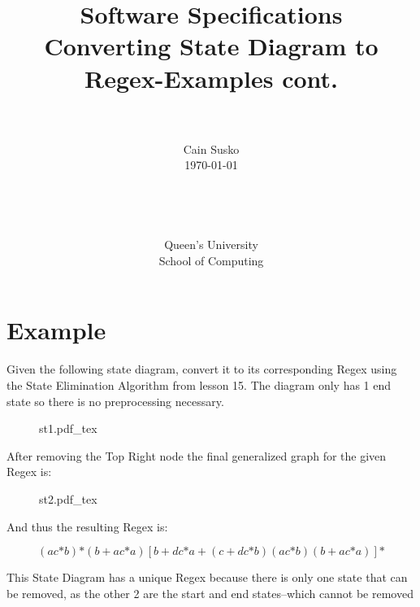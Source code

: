 \documentclass[12pt]{book}
\newcommand{\classID}{Converting State Diagram to Regex-Examples cont.}
\newcommand{\coursename}{Software Specifications}
\newcommand{\incfig}[1]{%
    {#1.pdf_tex}
}
\begin{document}
\date{}
\setlength{\parindent}{0em}  %

\title{\coursename\\\classID}

\author{\\ \\ Cain Susko\\\today \\ \\ \\ \\ \\
        Queen's University \\School of Computing} 
 

\maketitle
\pagebreak

\section*{Example}

Given the following state diagram, convert it to its corresponding Regex using the State Elimination Algorithm from lesson 15.
The diagram only has 1 end state so there is no preprocessing necessary.
\begin{figure}[h]
        \centering
        \incfig{st1}
\end{figure}

After removing the Top Right node the final generalized graph for the given Regex is:
\begin{figure}[h]
        \centering
        \incfig{st2}
\end{figure}

And thus the resulting Regex is:

\[(ac\text{*}b)\text{*}(b+ac\text{*}a)[b+dc\text{*}a+(c+dc\text{*}b)(ac\text{*}b)(b+ac\text{*}a)]\text{*}\]

This State Diagram has a unique Regex because there is only one state that can be removed, as the other 2 are the 
        start and end states--which cannot be removed
\end{document}
